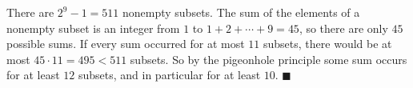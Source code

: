 There are $2^9-1=511$ nonempty subsets. The sum of the elements of a nonempty subset is an integer from $1$ to $1+2+\cdots+9=45$, so there are only $45$ possible sums. If every sum occurred for at most $11$ subsets, there would be at most $45\cdot11=495<511$ subsets. So by the pigeonhole principle some sum occurs for at least $12$ subsets, and in particular for at least $10$. $\blacksquare$

